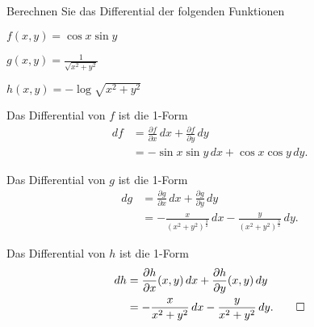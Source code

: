 Berechnen Sie das Differential der folgenden Funktionen
\begin{teilaufgaben}
\item $f(x,y)=\cos x\sin y$
\item $\displaystyle g(x,y)=\frac1{\!\sqrt{x^2+y^2}}$
\item $h(x,y)=-\log \!\sqrt{x^2+y^2}$
\end{teilaufgaben}

\begin{loesung}
\begin{teilaufgaben}
\item Das Differential von $f$ ist die 1-Form
\begin{align*}
df
&=
\frac{\partial f}{\partial x}\,dx
+
\frac{\partial f}{\partial y}\,dy
\\
&=
-\sin x \sin y \,dx
+\cos x \cos y \,dy.
\end{align*}
\item Das Differential von $g$ ist die 1-Form
\begin{align*}
dg
&=
\frac{\partial g}{\partial x}\,dx
+
\frac{\partial g}{\partial y}\,dy
\\
&=
-\frac{x}{(x^2+y^2)^{\frac32}}\,dx
-\frac{y}{(x^2+y^2)^{\frac32}}\,dy.
\end{align*}
\item Das Differential von $h$ ist die 1-Form
\begin{align*}
dh
&=
\frac{\partial h}{\partial x}(x,y)\,dx
+
\frac{\partial h}{\partial y}(x,y)\,dy
\\
&=
-
\frac{x}{x^2+y^2}\,dx
-
\frac{y}{x^2+y^2}\,dy.
\qedhere
\end{align*}
\end{teilaufgaben}
\end{loesung}

